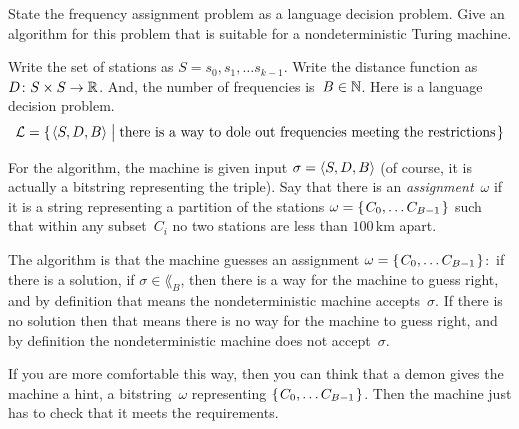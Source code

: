 \documentclass[answers, nolegalese, 11pt]{examjh}
\begin{document}
\begin{questions}

\question
State  the frequency assignment problem as a language decision problem.
Give an algorithm for this problem that is
suitable for a nondeterministic Turing machine.
\begin{solution}
Write the set of stations as $S={s_0, s_1, \ldots{} s_{k-1}}$.
Write the distance function as $\mbox{$D\colon S\times S\to \mathbb{R}$}$.
And, the number of frequencies is~$B\in \mathbb{N}$. 
Here is a language decision problem.
\begin{equation*}
  \lang=\set{\sequence{S,D,B}\suchthat 
           \text{there is a way to dole out frequencies meeting the restrictions}}
\end{equation*}

For the algorithm, the machine is given input $\sigma=\langle S,D,B\rangle$
(of course, it is actually a bitstring representing the triple).
Say that there is an \textit{assignment}~$\omega$ 
if it is a string representing a partition of 
the stations $\omega=\set{C_0,\ldots{} C_{B-1}}$ 
such that within any subset~$C_i$ 
no two stations are less than $100$\,km apart.

The algorithm is that the machine guesses an assignment
$\omega=\set{C_0,\ldots{} C_{B-1}}$:~if 
there is a solution, if $\sigma\in \lang_B$, 
then there is a way for the machine to guess right,
and by definition that means the nondeterministic machine accepts~$\sigma$.
If there is no solution then that means there is no way for the machine
to guess right, and by definition the nondeterministic machine does
not accept~$\sigma$.

If you are more comfortable this way, then you can think that a demon
gives the machine a hint, a bitstring~$\omega$ representing
$\set{C_0,\ldots{} C_{B-1}}$.  
Then the machine just has to check that it meets the requirements.
\end{solution}


\end{questions}
\end{document}
